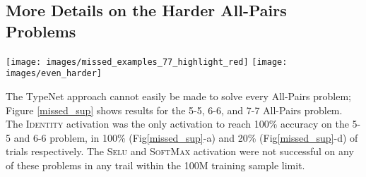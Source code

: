 \subsection{More Details on the Harder All-Pairs Problems}

\begin{figure*}[!htb]
  \texttt{[image: images/missed\_examples\_77\_highlight\_red]}
  \endminipage\hfill
{}
  \texttt{[image: images/even\_harder]}
\endminipage\hfill
\caption{\emph{Left}: Examples of incorrect test samples from TypeNet $\mathsf{96{\text -}II{\text -}w}$ trained on 7-7 All-Pairs for 200M samples.  White symbols can be paired, leaving the red symbols unpaired.
  \emph{Right}: Test results of applying TypeNet to more difficult All-Pairs problems.  Wider \textbf{conv} receptive fields are notated with ``-$\mathsf{w}$'', see text for details. }
\label{missed_sup}
\end{figure*}


The TypeNet approach cannot easily be made to solve every All-Pairs
problem; Figure \ref{missed_sup} shows results for the 5-5, 6-6, and 7-7 All-Pairs problem.
The \textsc{Identity} activation was the only activation to reach 100\% accuracy on the
5-5 and 6-6 problem, in 100\% (Fig\ref{missed_sup}-a) and 20\% (Fig\ref{missed_sup}-d) of trials respectively.  The \textsc{Selu} and \textsc{SoftMax} activation
were not successful on any of these problems in any trail within the 100M
training sample limit.


